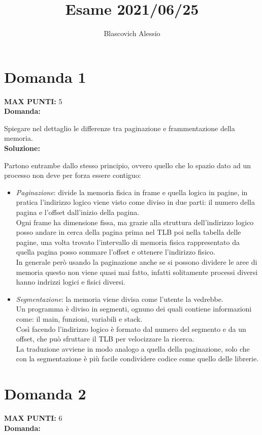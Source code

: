 \documentclass{article}
\title{Esame 2021/06/25}
\author{Blascovich Alessio}
\date{}
\begin{document}
   \maketitle
   \section*{Domanda 1}
   \textbf{MAX PUNTI:} 5\\
   \textbf{Domanda:}


   Spiegare nel dettaglio le differenze tra paginazione e frammentazione della memoria.\\
   \textbf{Soluzione:}


   Partono entrambe dallo stesso principio, ovvero quello che lo spazio dato ad un processo non deve per forza essere contiguo:
   \begin{itemize}
      \item \emph{Paginazione}: divide la memoria fisica in frame e quella logica in pagine, in pratica l'indirizzo logico viene visto come diviso in due parti: il numero della pagina e l'offset dall'inizio della pagina.\\
         Ogni frame ha dimensione fissa, ma grazie alla struttura dell'indirizzo logico posso andare in cerca della pagina prima nel TLB poi nella tabella delle pagine, una volta trovato l'intervallo di memoria fisica rappresentato da quella pagina posso sommare l'offset e ottenere l'indirizzo fisico.\\
         In generale però usando la paginazione anche se si possono dividere le aree di memoria questo non viene quasi mai fatto, infatti solitamente processi diversi hanno indrizzi logici e fisici diversi.
      \item \emph{Segmentazione}: la memoria viene divisa come l'utente la vedrebbe.\\
         Un programma è diviso in segmenti, ognuno dei quali contiene informazioni come: il main, funzioni, variabili e stack.\\
         Così facendo l'indirizzo logico è formato dal numero del segmento e da un offset, che può sfruttare il TLB per velocizzare la ricerca.\\
         La traduzione avviene in modo analogo a quella della paginazione, solo che con la segmentazione è più facile condividere codice come quello delle librerie.
   \end{itemize}
   \section*{Domanda 2}
   \textbf{MAX PUNTI:} 6\\
   \textbf{Domanda:}
\end{document}
